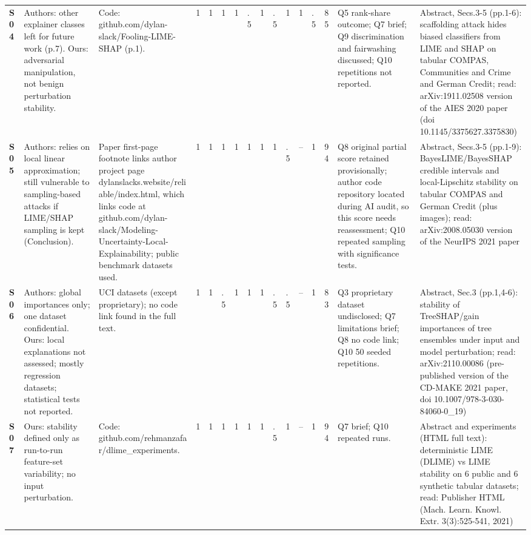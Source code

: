 \begin{longtable}{@{}P{1.0cm}P{4.6cm}P{3.6cm}P{0.3cm}P{0.3cm}P{0.3cm}P{0.3cm}P{0.3cm}P{0.3cm}P{0.3cm}P{0.3cm}P{0.3cm}P{0.36cm}P{0.75cm}P{3.0cm}P{3.9cm}@{}}
\textbf{S04} & Authors: other explainer classes left for future work (p.7). Ours: adversarial manipulation, not benign perturbation stability. & Code: github.com/\allowbreak{}dylan-slack/\allowbreak{}Fooling-LIME-SHAP (p.1). & 1 & 1 & 1 & 1 & .5 & 1 & .5 & 1 & 1 & .5 & 85 & Q5 rank-share outcome; Q7 brief; Q9 discrimination and fairwashing discussed; Q10 repetitions not reported. & Abstract, Secs.3-5 (pp.1-6): scaffolding attack hides biased classifiers from LIME and SHAP on tabular COMPAS, Communities and Crime and German Credit; read: arXiv:1911.02508 version of the AIES 2020 paper (doi 10.1145/\allowbreak{}3375627.3375830) \\
\textbf{S05} & Authors: relies on local linear approximation; still vulnerable to sampling-based attacks if LIME/\allowbreak{}SHAP sampling is kept (Conclusion). & Paper first-page footnote links author project page dylanslacks.website/\allowbreak{}reliable/\allowbreak{}index.html, which links code at github.com/\allowbreak{}dylan-slack/\allowbreak{}Modeling-Uncertainty-Local-Explainability; public benchmark datasets used. & 1 & 1 & 1 & 1 & 1 & 1 & 1 & .5 & -- & 1 & 94 & Q8 original partial score retained provisionally; author code repository located during AI audit, so this score needs reassessment; Q10 repeated sampling with significance tests. & Abstract, Secs.3-5 (pp.1-9): BayesLIME/\allowbreak{}BayesSHAP credible intervals and local-Lipschitz stability on tabular COMPAS and German Credit (plus images); read: arXiv:2008.05030 version of the NeurIPS 2021 paper \\
\textbf{S06} & Authors: global importances only; one dataset confidential. Ours: local explanations not assessed; mostly regression datasets; statistical tests not reported. & UCI datasets (except proprietary); no code link found in the full text. & 1 & 1 & .5 & 1 & 1 & 1 & .5 & .5 & -- & 1 & 83 & Q3 proprietary dataset undisclosed; Q7 limitations brief; Q8 no code link; Q10 50 seeded repetitions. & Abstract, Sec.3 (pp.1,4-6): stability of TreeSHAP/\allowbreak{}gain importances of tree ensembles under input and model perturbation; read: arXiv:2110.00086 (pre-published version of the CD-MAKE 2021 paper, doi 10.1007/\allowbreak{}978-3-030-84060-0\_\allowbreak{}19) \\
\textbf{S07} & Ours: stability defined only as run-to-run feature-set variability; no input perturbation. & Code: github.com/\allowbreak{}rehmanzafar/\allowbreak{}dlime\_\allowbreak{}experiments. & 1 & 1 & 1 & 1 & 1 & 1 & .5 & 1 & -- & 1 & 94 & Q7 brief; Q10 repeated runs. & Abstract and experiments (HTML full text): deterministic LIME (DLIME) vs LIME stability on 6 public and 6 synthetic tabular datasets; read: Publisher HTML (Mach. Learn. Knowl. Extr. 3(3):525-541, 2021) \\

\end{longtable}

